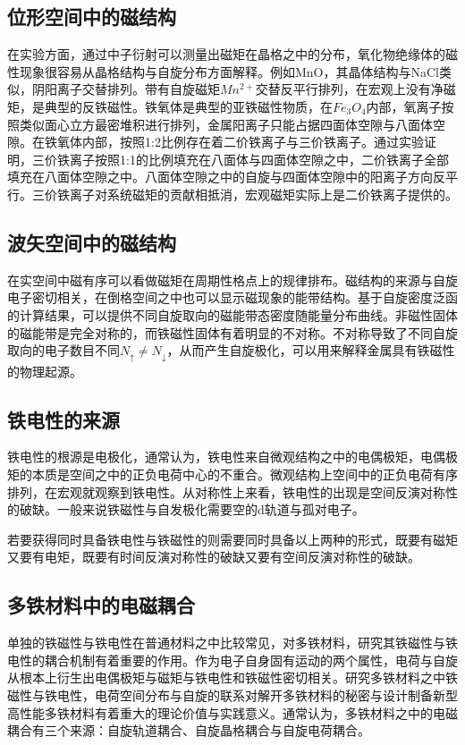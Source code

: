\subsection{位形空间中的磁结构}

在实验方面，通过中子衍射可以测量出磁矩在晶格之中的分布，氧化物绝缘体的磁性现象很容易从晶格结构与自旋分布方面解释。例如MnO，其晶体结构与NaCl类似，阴阳离子交替排列。带有自旋磁矩$Mn^{2+}$交替反平行排列，在宏观上没有净磁矩，是典型的反铁磁性。铁氧体是典型的亚铁磁性物质，在$Fe_{3}O_{4}$内部，氧离子按照类似面心立方最密堆积进行排列，金属阳离子只能占据四面体空隙与八面体空隙。在铁氧体内部，按照1:2比例存在着二价铁离子与三价铁离子。通过实验证明，三价铁离子按照1:1的比例填充在八面体与四面体空隙之中，二价铁离子全部填充在八面体空隙之中。八面体空隙之中的自旋与四面体空隙中的阳离子方向反平行。三价铁离子对系统磁矩的贡献相抵消，宏观磁矩实际上是二价铁离子提供的。

\subsection{波矢空间中的磁结构}

在实空间中磁有序可以看做磁矩在周期性格点上的规律排布。磁结构的来源与自旋电子密切相关，在倒格空间之中也可以显示磁现象的能带结构。基于自旋密度泛函的计算结果，可以提供不同自旋取向的磁能带态密度随能量分布曲线。非磁性固体的磁能带是完全对称的，而铁磁性固体有着明显的不对称。不对称导致了不同自旋取向的电子数目不同$N_{\uparrow }\neq N_{\downarrow }$，从而产生自旋极化，可以用来解释金属具有铁磁性的物理起源。


\subsection{铁电性的来源}

铁电性的根源是电极化，通常认为，铁电性来自微观结构之中的电偶极矩，电偶极矩的本质是空间之中的正负电荷中心的不重合。微观结构上空间中的正负电荷有序排列，在宏观就观察到铁电性。从对称性上来看，铁电性的出现是空间反演对称性的破缺。一般来说铁磁性与自发极化需要空的d轨道与孤对电子。

若要获得同时具备铁电性与铁磁性的则需要同时具备以上两种的形式，既要有磁矩又要有电矩，既要有时间反演对称性的破缺又要有空间反演对称性的破缺。

\subsection{多铁材料中的电磁耦合}

单独的铁磁性与铁电性在普通材料之中比较常见，对多铁材料，研究其铁磁性与铁电性的耦合机制有着重要的作用。作为电子自身固有运动的两个属性，电荷与自旋从根本上衍生出电偶极矩与磁矩与铁电性和铁磁性密切相关。研究多铁材料之中铁磁性与铁电性，电荷空间分布与自旋的联系对解开多铁材料的秘密与设计制备新型高性能多铁材料有着重大的理论价值与实践意义。通常认为，多铁材料之中的电磁耦合有三个来源：自旋轨道耦合、自旋晶格耦合与自旋电荷耦合。\cite{nan2019multiferroics}

